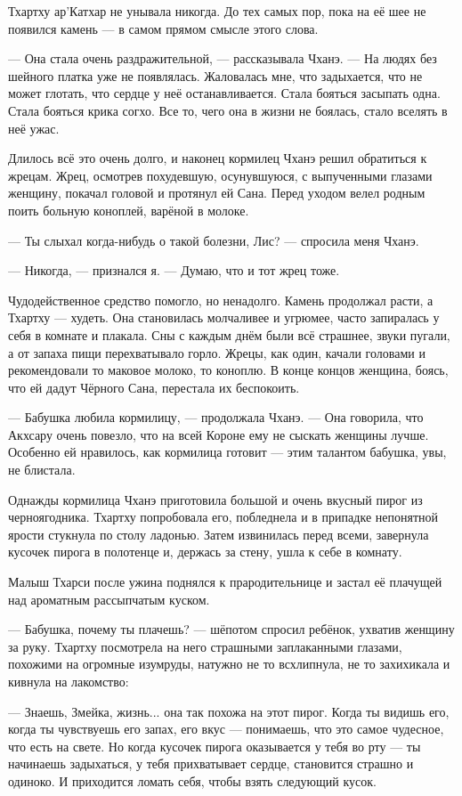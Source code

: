 Тхартху ар’Катхар не унывала никогда.
До тех самых пор, пока на её шее не появился камень --- в самом прямом смысле этого слова.

--- Она стала очень раздражительной, --- рассказывала Чханэ.
--- На людях без шейного платка уже не появлялась.
Жаловалась мне, что задыхается, что не может глотать, что сердце у неё останавливается.
Стала бояться засыпать одна.
Стала бояться крика согхо.
Все то, чего она в жизни не боялась, стало вселять в неё ужас.

Длилось всё это очень долго, и наконец кормилец Чханэ решил обратиться к жрецам.
Жрец, осмотрев похудевшую, осунувшуюся, с выпученными глазами женщину, покачал головой и протянул ей Сана.
Перед уходом велел родным поить больную коноплей, варёной в молоке.

--- Ты слыхал когда-нибудь о такой болезни, Лис? --- спросила меня Чханэ.

--- Никогда, --- признался я.
--- Думаю, что и тот жрец тоже.

Чудодейственное средство помогло, но ненадолго.
Камень продолжал расти, а Тхартху --- худеть.
Она становилась молчаливее и угрюмее, часто запиралась у себя в комнате и плакала.
Сны с каждым днём были всё страшнее, звуки пугали, а от запаха пищи перехватывало горло.
Жрецы, как один, качали головами и рекомендовали то маковое молоко, то коноплю.
В конце концов женщина, боясь, что ей дадут Чёрного Сана, перестала их беспокоить.

--- Бабушка любила кормилицу, --- продолжала Чханэ.
--- Она говорила, что Акхсару очень повезло, что на всей Короне ему не сыскать женщины лучше.
Особенно ей нравилось, как кормилица готовит --- этим талантом бабушка, увы, не блистала.

Однажды кормилица Чханэ приготовила большой и очень вкусный пирог из черноягодника.
Тхартху попробовала его, побледнела и в припадке непонятной ярости стукнула по столу ладонью.
Затем извинилась перед всеми, завернула кусочек пирога в полотенце и, держась за стену, ушла к себе в комнату.

Малыш Тхарси после ужина поднялся к прародительнице и застал её плачущей над ароматным рассыпчатым куском.

--- Бабушка, почему ты плачешь? --- шёпотом спросил ребёнок, ухватив женщину за руку.
Тхартху посмотрела на него страшными заплаканными глазами, похожими на огромные изумруды, натужно не то всхлипнула, не то захихикала и кивнула на лакомство:

--- Знаешь, Змейка, жизнь... она так похожа на этот пирог.
Когда ты видишь его, когда ты чувствуешь его запах, его вкус --- понимаешь, что это самое чудесное, что есть на свете.
Но когда кусочек пирога оказывается у тебя во рту --- ты начинаешь задыхаться, у тебя прихватывает сердце, становится страшно и одиноко.
И приходится ломать себя, чтобы взять следующий кусок.

